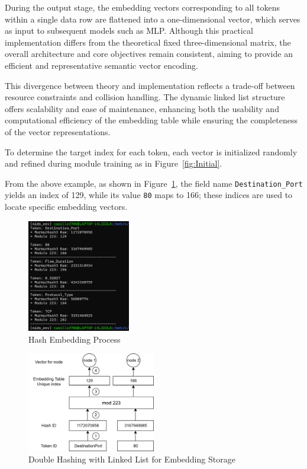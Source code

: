 \begin{ZhChapter}
    During the output stage, the embedding vectors corresponding to all tokens within a single data row are flattened into a one-dimensional vector, which serves as input to subsequent models such as MLP. Although this practical implementation differs from the theoretical fixed three-dimensional matrix, the overall architecture and core objectives remain consistent, aiming to provide an efficient and representative semantic vector encoding.

    This divergence between theory and implementation reflects a trade-off between resource constraints and collision handling. The dynamic linked list structure offers scalability and ease of maintenance, enhancing both the usability and computational efficiency of the embedding table while ensuring the completeness of the vector representations.


    To determine the target index for each token, each vector is initialized randomly and refined during module training as in Figure~\ref{fig:Initial}.

    From the above example, as shown in Figure~\ref{fig:hashembedding}, the field name \texttt{Destination\_Port} yields an index of 129, while its value \texttt{80} maps to 166; these indices are used to locate specific embedding vectors.

    \begin{figure}[!t]
        \centering
        \includegraphics[width = 0.4\textwidth]{image/2025-06-30 002218.jpg}
        \caption{Hash Embedding Process}
        \label{fig:hashembedding}
    \end{figure}


    \begin{figure}[htbp]
        \centering
        \includegraphics[width = 0.5\textwidth]{image/EmbeddingFlow.jpg}
        \caption{Double Hashing with Linked List for Embedding Storage}
        \label{fig:HashEmbeddingFlow}
    \end{figure}



\end{ZhChapter}
